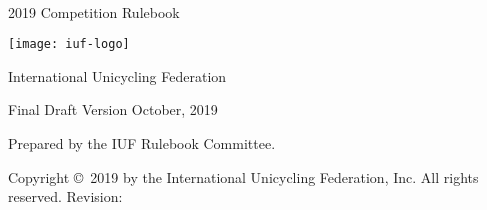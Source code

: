 \begin{titlepage}
\centering
\ \\
\vspace{5cm}
{\Huge 2019 Competition Rulebook}
\vspace{5mm}

\texttt{[image: iuf-logo]}

\vspace{5mm}
{\huge International Unicycling Federation}

\vspace{5mm}
{\Large Final Draft Version \quad October, 2019}

\vspace{45mm}
Prepared by the IUF Rulebook Committee.

\vspace{5mm}
{\small Copyright \copyright\ 2019 by the International Unicycling Federation, Inc. All rights reserved.}
\small{Revision: \href{https://github.com/iuf/rulebook/commit/\gitHash}{\gitAbbrevHash} \ \gitCommitterDate}

\end{titlepage}
